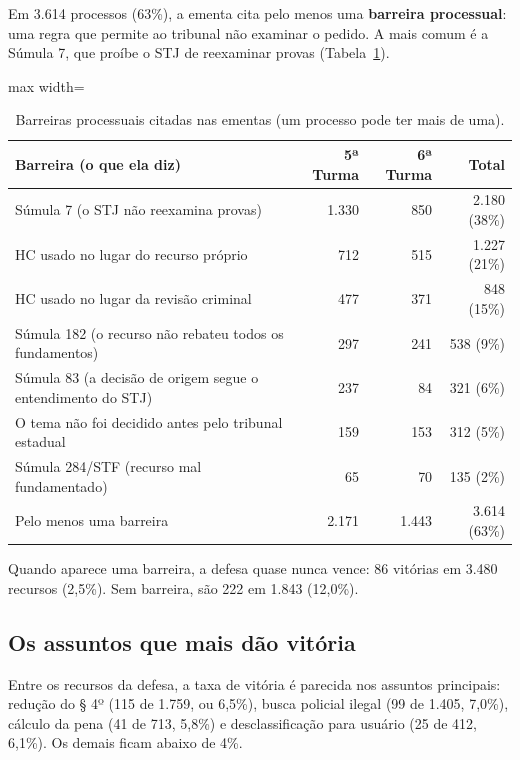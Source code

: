 Em 3.614 processos (63\%), a ementa cita pelo menos uma \textbf{barreira processual}: uma
regra que permite ao tribunal não examinar o pedido. A mais comum é a Súmula 7, que proíbe o
STJ de reexaminar provas (Tabela~\ref{tab:dados-barreiras}).

\begin{table}[h]
\centering\small
\caption{Barreiras processuais citadas nas ementas (um processo pode ter mais de uma).}
\label{tab:dados-barreiras}
\begin{adjustbox}{max width=\textwidth}
\begin{tabular}{p{8.2cm}rrr}
\toprule
Barreira (o que ela diz) & 5ª Turma & 6ª Turma & Total \\
\midrule
Súmula 7 (o STJ não reexamina provas) & 1.330 & 850 & 2.180 (38\%) \\
HC usado no lugar do recurso próprio & 712 & 515 & 1.227 (21\%) \\
HC usado no lugar da revisão criminal & 477 & 371 & 848 (15\%) \\
Súmula 182 (o recurso não rebateu todos os fundamentos) & 297 & 241 & 538 (9\%) \\
Súmula 83 (a decisão de origem segue o entendimento do STJ) & 237 & 84 & 321 (6\%) \\
O tema não foi decidido antes pelo tribunal estadual & 159 & 153 & 312 (5\%) \\
Súmula 284/STF (recurso mal fundamentado) & 65 & 70 & 135 (2\%) \\
\midrule
Pelo menos uma barreira & 2.171 & 1.443 & 3.614 (63\%) \\
\bottomrule
\end{tabular}
\end{adjustbox}
\end{table}

Quando aparece uma barreira, a defesa quase nunca vence: 86 vitórias em 3.480 recursos
(2,5\%). Sem barreira, são 222 em 1.843 (12,0\%).

\subsection*{Os assuntos que mais dão vitória}

Entre os recursos da defesa, a taxa de vitória é parecida nos assuntos principais: redução
do § 4º (115 de 1.759, ou 6,5\%), busca policial ilegal (99 de 1.405, 7,0\%), cálculo da pena
(41 de 713, 5,8\%) e desclassificação para usuário (25 de 412, 6,1\%). Os demais ficam abaixo
de 4\%.

